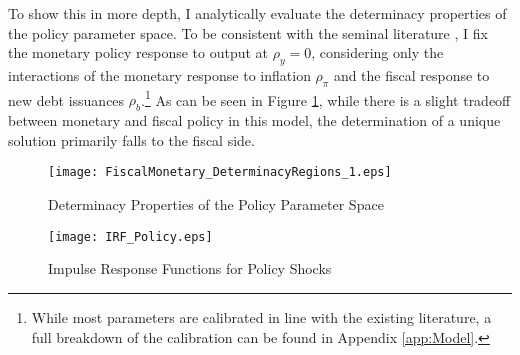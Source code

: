 \documentclass[11pt,a4paper,margin=1.5in]{article}
\begin{document}
To show this in more depth, I analytically evaluate the determinacy properties of the policy parameter space. 
To be consistent with the seminal literature \citep[e.g.][]{Leeper:1991}, I fix the monetary policy response to output at $\rho_y = 0$, considering only the interactions of the monetary response to inflation $\rho_\pi$ and the fiscal response to new debt issuances $\rho_b$.\footnote{
	While most parameters are calibrated in line with the existing literature, a full breakdown of the calibration can be found in   Appendix \ref{app:Model}.}
As can be seen in Figure \ref{fig:Determinacy}, while there is a slight tradeoff between monetary and fiscal policy in this model, the determination of a unique solution primarily falls to the fiscal side.
\begin{figure}[p]
\centering
\caption{Determinacy Properties of the Policy Parameter Space}
\label{fig:Determinacy}
\texttt{[image: FiscalMonetary\_DeterminacyRegions\_1.eps]}
\end{figure} 
\begin{figure}[p]
\centering
\caption{Impulse Response Functions for Policy Shocks}
\vspace{0.3em}
\label{fig:IRF_Policy}
\texttt{[image: IRF\_Policy.eps]}
\end{figure} 
\end{document}
